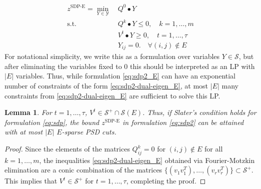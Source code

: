 \documentclass[twoside]{article}
\newtheorem{lemma}[thm]{Lemma}
\newcommand{\oo}[1]{{\textcolor{blue}{#1}}}
\newcommand{\ooc}[1]{{ \oo{[OG comment: #1}]}}
\newcommand{\matip}[2]{#1 \bullet #2}
\begin{document}
	\begin{subequations}\label{eq:sdp2_E}\begin{align}
			z^{\text{SDP-E}}=\min_{Y \in \mathcal{Y}} \ & \matip{Q^0}{Y} \\
			\text{s.t. } & \matip{Q^k}{Y}  \leq 0,  \quad k=1,\ldots, m \\
			& \matip{V^t}{Y}  \ge 0
			,  \quad t=1,\ldots,\tau  \label{eq:sdp2-dual-eigen_E} \\
			& Y_{ij} = 0. \quad \forall (i,j) \notin E
	\end{align}\end{subequations}
		For notational simplicity, we write this as a formulation over variables $Y \in \mathcal{S}$, but after eliminating the variables fixed to $0$ this should be interpreted as an LP with $|E|$ variables.
		Thus, while  formulation \eqref{eq:sdp2_E} can have an exponential number of constraints of the form \eqref{eq:sdp2-dual-eigen_E}, at most $|E|$ many constraints from \eqref{eq:sdp2-dual-eigen_E} are sufficient to solve this LP. 
		
		\begin{lemma}
			\label{lem:evecsup}
			For $t=1,\ldots,\tau$, $V^t \in \mathcal{S}^+\cap \mathcal{S}(E)$. Thus, if Slater's condition holds for formulation \eqref{eq:sdp}, the bound $z^{\text{SDP-E}}$ in formulation \eqref{eq:sdp2} can be attained with at most $|E|$ $E$-sparse PSD cuts.
		\end{lemma}
		\begin{proof}
			Since the elements of the matrices $Q^k_{ij} = 0$ for $(i,j) \notin E$ for all $k=1,\ldots,m$, the inequalities \eqref{eq:sdp2-dual-eigen_E} obtained via Fourier-Motzkin elimination are a conic combination of the matrices  $\{(v_1v_1^T),\ldots,(v_rv_r^T)\}\subset\mathcal{S}^+$.
			This implies that $V^t \in \mathcal{S}^+$ for $t=1,\ldots,\tau$, completing the proof.  %
		\end{proof}
		
\end{document}
